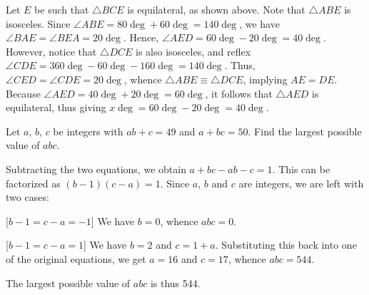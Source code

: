 \begin{solution*}
    Let $E$ be such that $\triangle BCE$ is equilateral, as shown above. Note that $\triangle ABE$ is isosceles. Since $\angle ABE = 80\deg + 60 \deg = 140 \deg$, we have $\angle BAE = \angle BEA = 20\deg$. Hence, $\angle AED = 60\deg - 20\deg = 40\deg$. However, notice that $\triangle DCE$ is also isosceles, and reflex $\angle CDE = 360\deg - 60\deg - 160\deg = 140\deg$. Thus, $\angle CED = \angle CDE = 20 \deg$, whence $\triangle ABE \equiv \triangle DCE$, implying $AE = DE$. Because $\angle AED = 40\deg + 20\deg = 60\deg$, it follows that $\triangle AED$ is equilateral, thus giving $x\deg = 60\deg - 20\deg = 40\deg$. 
\end{solution*}

\begin{question}[544]\label{A::2022-O-1-11}
    Let $a$, $b$, $c$ be integers with $ab + c = 49$ and $a + bc = 50$. Find the largest possible value of $abc$.
\end{question}
\begin{solution*}
    Subtracting the two equations, we obtain $a + bc - ab - c = 1$. This can be factorized as $(b-1)(c-a) = 1$. Since $a$, $b$ and $c$ are integers, we are left with two cases:

    [$b-1 = c-a = -1$] We have $b = 0$, whence $abc = 0$.

    [$b-1 = c-a = 1$] We have $b = 2$ and $c = 1 + a$. Substituting this back into one of the original equations, we get $a = 16$ and $c = 17$, whence $abc = 544$.

    The largest possible value of $abc$ is thus 544.
\end{solution*}

